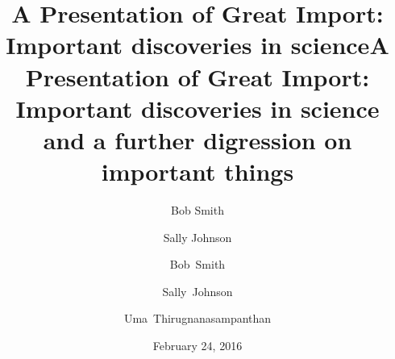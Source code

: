 \documentclass{beamer}
\title[A Presentation of Great Import]{A Presentation of Great Import:\\Important discoveries in science}
\author{Bob Smith \and  Sally Johnson}
\institute{State University}
\date{February 24, 2016}
\begin{document}
\begin{frame}[plain]
    \titlepage
\end{frame} 

\title[A Presentation of Great Import]{A Presentation of Great Import:\\Important discoveries in science\\and a further digression on important things}
\author{Bob~Smith \and  Sally~Johnson \and Uma~Thirugnanasampanthan}

\begin{frame}[plain]
    \titlepage
\end{frame} 
\end{document}
